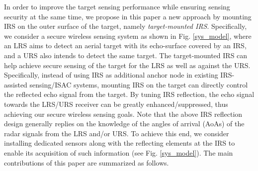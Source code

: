 \documentclass[10pt,final,doublecolumn]{IEEEtran}
\begin{document}
In order to improve the target sensing performance while ensuring sensing security at the same time, we propose in this paper a new approach by mounting IRS on the outer surface of the target, namely {\it target-mounted IRS}. Specifically, we consider a secure wireless sensing system as shown in Fig. \ref{sys_model}, where an LRS aims to detect an aerial target with its echo-surface covered by an IRS, and a URS also intends to detect the same target. The target-mounted IRS can help achieve secure sensing of the target for the LRS as well as against the URS. Specifically, instead of using IRS as additional anchor node in existing IRS-assisted sensing/ISAC systems, mounting IRS on the target can directly control the reflected echo signal from the target. By tuning IRS reflection, the echo signal towards the LRS/URS receiver can be greatly enhanced/suppressed, thus achieving our secure wireless sensing goals. Note that the above IRS reflection design generally replies on the knowledge of the angles of arrival (AoAs) of the radar signals from the LRS and/or URS. To achieve this end, we consider installing dedicated sensors along with the reflecting elements at the IRS to enable its acquisition of such information (see Fig. \ref{sys_model}). The main contributions of this paper are summarized as follows.
\end{document}
